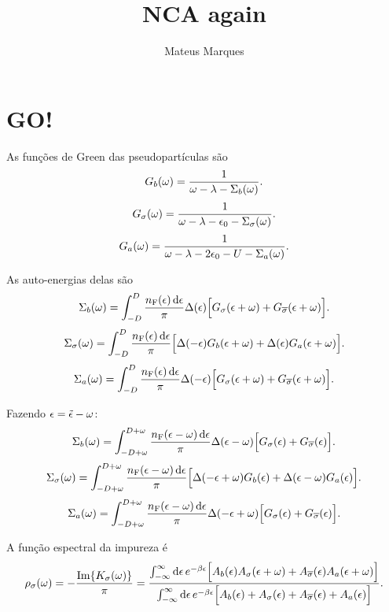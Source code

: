 \documentclass[a4paper,fleqn,12pt]{article}
\title{\Huge{\textbf{NCA again}}}
\author{Mateus Marques}
\begin{document}
\maketitle

\section{GO!}
As funções de Green das pseudopartículas são
$$
G_b(\omega) = \frac{1}{\omega - \lambda - \Sigma_b(\omega)}.
$$
$$
G_{\sigma}(\omega) = \frac{1}{\omega - \lambda - \epsilon_0 - \Sigma_\sigma(\omega)}.
$$
$$
G_a(\omega) = \frac{1}{\omega - \lambda - 2\epsilon_0 - U - \Sigma_a(\omega)}.
$$

As auto-energias delas são
$$
\Sigma_b(\omega) = \int_{-D}^{D} \frac{n_\text{F}(\epsilon) \dd{\epsilon}}{\pi}
\Delta(\epsilon)
\Big[
G_\sigma(\epsilon+\omega) + G_{\overline{\sigma}}(\epsilon+\omega)
\Big].
$$
$$
\Sigma_\sigma(\omega) = \int_{-D}^{D} \frac{n_\text{F}(\epsilon) \dd{\epsilon}}{\pi}
\Big[
\Delta(-\epsilon) G_b(\epsilon+\omega) + \Delta(\epsilon) G_a(\epsilon+\omega)
\Big].
$$
$$
\Sigma_a(\omega) = \int_{-D}^{D} \frac{n_\text{F}(\epsilon) \dd{\epsilon}}{\pi}
\Delta(-\epsilon)
\Big[
G_\sigma(\epsilon+\omega) + G_{\overline{\sigma}}(\epsilon+\omega)
\Big].
$$

Fazendo $\epsilon = \tilde{\epsilon} - \omega$:
$$
\Sigma_b(\omega) = \int_{-D+\omega}^{D+\omega} \frac{n_\text{F}(\epsilon-\omega) \dd{\epsilon}}{\pi}
\Delta(\epsilon-\omega)
\Big[
G_\sigma(\epsilon) + G_{\overline{\sigma}}(\epsilon)
\Big].
$$
$$
\Sigma_\sigma(\omega) = \int_{-D+\omega}^{D+\omega} \frac{n_\text{F}(\epsilon-\omega) \dd{\epsilon}}{\pi}
\Big[
\Delta(-\epsilon+\omega) G_b(\epsilon) + \Delta(\epsilon-\omega) G_a(\epsilon)
\Big].
$$
$$
\Sigma_a(\omega) = \int_{-D+\omega}^{D+\omega} \frac{n_\text{F}(\epsilon-\omega) \dd{\epsilon}}{\pi}
\Delta(-\epsilon+\omega)
\Big[
G_\sigma(\epsilon) + G_{\overline{\sigma}}(\epsilon)
\Big].
$$

A função espectral da impureza é
$$
\rho_\sigma(\omega) = - \frac{\Im{K_\sigma(\omega)}}{\pi} =
\frac{\int_{-\infty}^{\infty} \dd{\epsilon} e^{-\beta \epsilon}
\Big[A_b(\epsilon)A_\sigma(\epsilon+\omega) + A_{\overline{\sigma}}(\epsilon) A_a(\epsilon + \omega)\Big]}
{\int_{-\infty}^{\infty} \dd{\epsilon} e^{-\beta \epsilon}
\Big[A_b(\epsilon) + A_\sigma(\epsilon) + A_{\overline{\sigma}}(\epsilon) +  A_a(\epsilon)\Big]}.
$$
\end{document}
